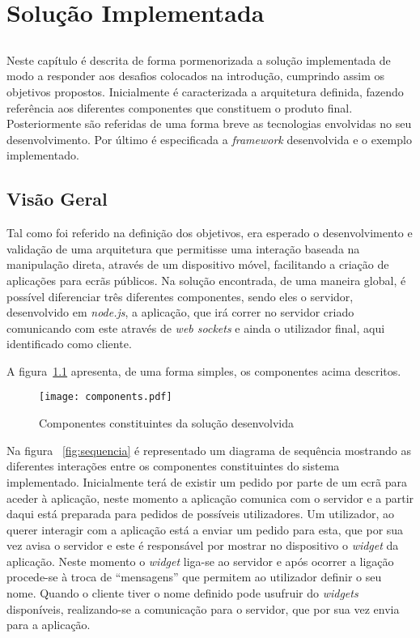\chapter{Solução Implementada} \label{chap:sol}

\section*{}

Neste capítulo é descrita de forma pormenorizada a solução implementada de modo a responder aos desafios colocados na introdução, cumprindo assim os objetivos propostos.
Inicialmente é caracterizada a arquitetura definida, fazendo referência aos diferentes componentes que constituem o produto final. Posteriormente são referidas de uma forma breve as tecnologias envolvidas no seu desenvolvimento.
Por último é especificada a \textit{framework} desenvolvida e o exemplo implementado.

\section{Visão Geral} \label{sec:geral}

Tal como foi referido na definição dos objetivos, era esperado o desenvolvimento e validação de uma arquitetura que permitisse uma interação baseada na manipulação direta, através de um dispositivo móvel, facilitando a criação de aplicações para ecrãs públicos.  
Na solução encontrada, de uma maneira global, é possível diferenciar três diferentes componentes, sendo eles o servidor, desenvolvido em \textit{node.js}, a aplicação, que irá correr no servidor criado comunicando com este através de \textit{web sockets} e ainda o utilizador final, aqui identificado como cliente.

A figura~\ref{fig:componentes} apresenta, de uma forma simples, os componentes acima descritos.

\begin{figure}[ht]
\centering
\texttt{[image: components.pdf]}
\caption[Componentes] {Componentes constituintes da solução desenvolvida}
\label{fig:componentes}
\end{figure}

Na figura ~\ref{fig:sequencia} é representado um diagrama de sequência mostrando as diferentes interações entre os componentes constituintes do sistema implementado. Inicialmente terá de existir um pedido por parte de um ecrã para aceder à aplicação, neste momento a aplicação comunica com o servidor e a partir daqui está preparada para pedidos de possíveis utilizadores. Um utilizador, ao querer interagir com a aplicação está a enviar um pedido para esta, que por sua vez avisa o servidor e este é responsável por mostrar no dispositivo o \textit{widget} da aplicação. Neste momento o \textit{widget} liga-se ao servidor e após ocorrer a ligação procede-se à troca de ``mensagens'' que permitem ao utilizador definir o seu nome. Quando o cliente tiver o nome definido pode usufruir do \textit{widgets} disponíveis, realizando-se a comunicação para o servidor, que por sua vez envia para a aplicação.

